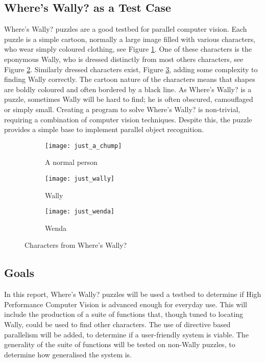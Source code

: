 \documentclass[../main.tex]{subfiles}
\begin{document}
    \subsection{Where's Wally? as a Test Case}
    Where's Wally? puzzles are a good testbed for parallel computer vision.
    Each puzzle is a simple cartoon, normally a large image filled with various characters, who wear simply coloured clothing, see Figure \ref{justachump}.
    One of these characters is the eponymous Wally, who is dressed distinctly from most others characters, see Figure \ref{justwally}.
    Similarly dressed characters exist, Figure \ref{justwenda}, adding some complexity to finding Wally correctly.
    The cartoon nature of the characters means that shapes are boldly coloured and often bordered by a black line.
    As Where's Wally? is a puzzle, sometimes Wally will be hard to find; he is often obscured, camouflaged or simply small.
    Creating a program to solve Where's Wally? is non-trivial, requiring a combination of computer vision techniques.
    Despite this, the puzzle provides a simple base to implement parallel object recognition.

    \begin{figure}[H]
    \centering
      \begin{subfigure}[b]{0.3\textwidth}
        \centering
        \texttt{[image: just\_a\_chump]}   
        \caption{A normal person}
        \label{justachump}
      \end{subfigure}
      \begin{subfigure}[b]{0.3\textwidth}
        \centering
        \texttt{[image: just\_wally]}   
        \caption{Wally}
        \label{justwally}
      \end{subfigure}
      \begin{subfigure}[b]{0.3\textwidth}
        \centering
        \texttt{[image: just\_wenda]}   
        \caption{Wenda}
        \label{justwenda}
      \end{subfigure}
    \caption{Characters from Where's Wally?}
    \label{wallychars}
    \end{figure}
    \subsection{Goals}
    In this report, Where's Wally? puzzles will be used a testbed to determine if High Performance Computer Vision is advanced enough for everyday use.
    This will include the production of a suite of functions that, though tuned to locating Wally, could be used to find other characters.
    The use of directive based parallelism will be added, to determine if a user-friendly system is viable.
    The generality of the suite of functions will be tested on non-Wally puzzles, to determine how generalised the system is.
\end{document}
